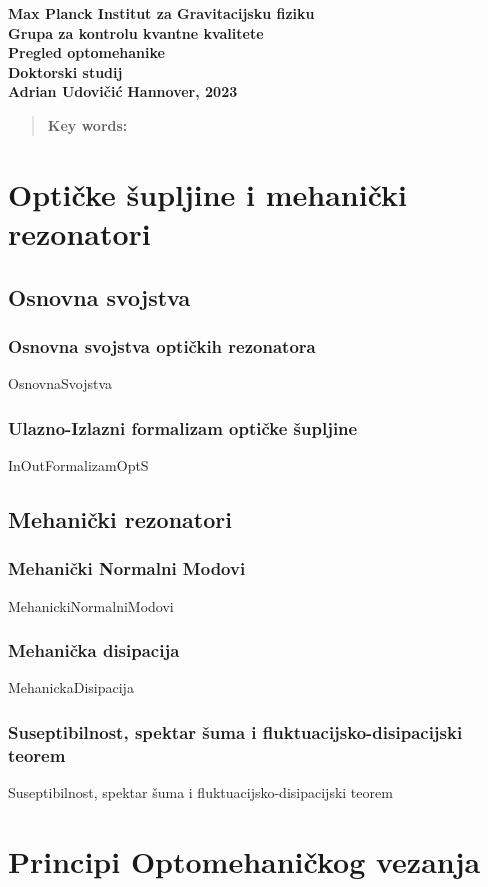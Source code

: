 \documentclass[10pt,leqno]{article}
\begin{document}
\begin{titlepage}
	\begin{center}
		{\large \textbf{Max Planck Institut za Gravitacijsku fiziku}} \\[0.1cm]
		{\large \textbf{Grupa za kontrolu kvantne kvalitete}}\\[0.1cm]
		{\large \textbf{Pregled optomehanike}} \\[0.1cm]
		{\large\textbf{Doktorski studij}}\\[2.5cm]
		\vspace{2cm}
		{\LARGE \textbf{Adrian Udovičić}}
		\vfill
		\large\textbf{{Hannover, 2023} }
	\end{center}
\end{titlepage}

\newpage
{}
\begin{abstract}
	\textbf{Key words:}
\end{abstract}
\newpage
\tableofcontents
\hrulefill
\newpage

\chapter{Optičke šupljine i mehanički rezonatori}
\section{Osnovna svojstva}
\subsection{Osnovna svojstva optičkih rezonatora}
{OsnovnaSvojstva}
\newpage
\subsection{Ulazno-Izlazni formalizam optičke šupljine}
{InOutFormalizamOptS}
\section{Mehanički rezonatori}
\subsection{Mehanički Normalni Modovi}
{MehanickiNormalniModovi}
\subsection{Mehanička disipacija}
{MehanickaDisipacija}
\subsection{Suseptibilnost, spektar šuma i fluktuacijsko-disipacijski teorem}
{Suseptibilnost, spektar šuma i fluktuacijsko-disipacijski teorem}

\newpage
\chapter{Principi Optomehaničkog vezanja}


\listoftables
\listoffigures
\end{document}
